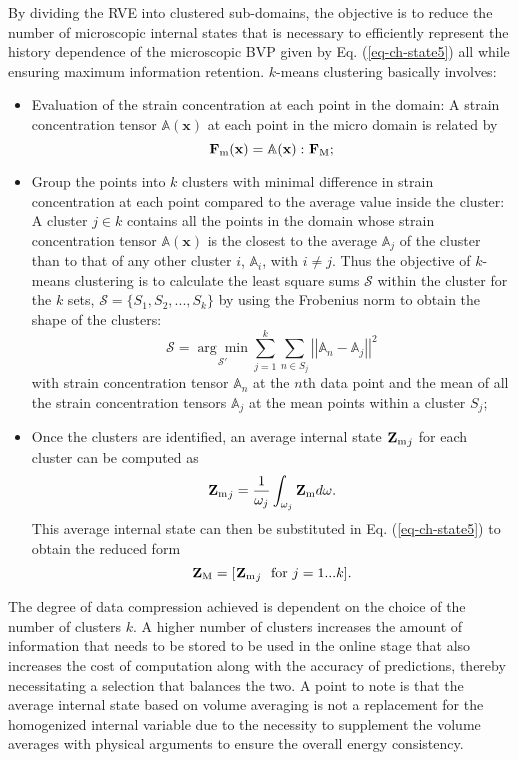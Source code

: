 By dividing the RVE into clustered sub-domains, the objective is to reduce the number of microscopic internal states that is necessary to efficiently represent the history dependence of the microscopic BVP given by Eq. (\ref{eq-ch-state5}) all while ensuring maximum information retention. $ k $-means clustering basically involves:
\begin{itemize}
	\item Evaluation of the strain concentration at each point in the domain: 
	A strain concentration tensor $ \mathbb{A}(\textbf{x}) $ at each point in the micro domain is related by
	\begin{equation}\label{eq-ch-cluster1}
		\tgmm[]{F}(\textbf{x})=\mathbb{A}(\textbf{x}):\tgm[]{F};
	\end{equation}
	\item Group the points into $ k $ clusters with minimal difference in strain concentration at each point compared to the average value inside the cluster: A cluster $ j\in k $ contains all the points in the domain whose strain concentration tensor $ \mathbb{A}(\textbf{x}) $ is the closest to the average  $ \mathbb{A}_j $ of the cluster than to that of any other cluster $ i $,  $ \mathbb{A}_i$, with $ i\ne j $. Thus the objective of $ k $-means clustering is to calculate the least square sums $ \mathcal{S} $ within the cluster for the $ k $ sets, $ \mathcal{S}=\{S_1,S_2,...,S_k\} $ by using the Frobenius norm to obtain the shape of the clusters:
	\begin{equation}\label{eq-ch-cluster2}
	\mathcal{S}=\underset{\mathcal{S}'}{\arg\min}\sum_{j=1}^{k}\sum_{n\in S_j}^{}\left|\left|\mathbb{A}_n-\mathbb{A}_j\right|\right|^2
	\end{equation}
	with strain concentration tensor $ \mathbb{A}_n $ at the $ n $th data point and the mean of all the strain concentration tensors $ \mathbb{A}_j $ at the mean points within a cluster $ S_j $;
	\item Once the clusters are identified, an average internal state $ {\tgmm[]{Z}}_j $ for each cluster can be computed as
	\begin{equation}\label{eq-ch-cluster3}
	{\tgmm[]{Z}}_j=\frac{1}{\omega_j}\int_{\omega_j}\tgmm[]{Z}d\omega.
	\end{equation}
	This average internal state can then be substituted in Eq. (\ref{eq-ch-state5}) to obtain the reduced form
	\begin{equation}\label{eq-ch-cluster4}
	\tgm[]{Z}=[{\tgmm[]{Z}}_j\ \ \text{for}\ j=1...k].
	\end{equation}
\end{itemize}
The degree of data compression achieved is dependent on the choice of the number of clusters $ k $. A higher number of clusters increases the amount of information that needs to be stored to be used in the online stage that also increases the cost of computation along with the accuracy of predictions, thereby necessitating a selection that balances the two. A point to note is that the average internal state based on volume averaging is not a replacement for the homogenized internal variable due to the necessity to supplement the volume averages with physical arguments to ensure the overall energy consistency\cite{berrymanComparisonUpscalingMethods2005}.

